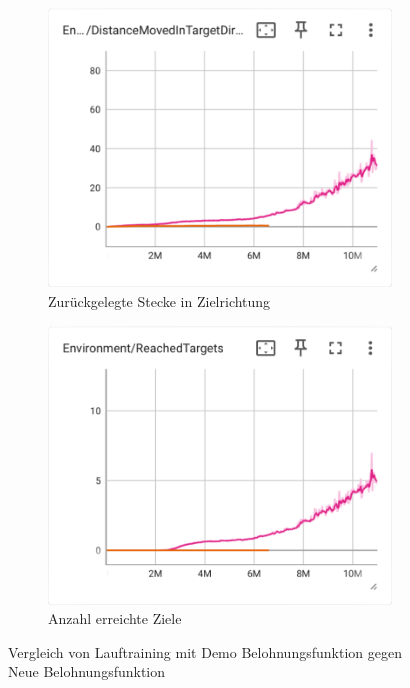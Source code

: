 \begin{figure}[H]
  \centering  
  \begin{subfigure}{.49\textwidth}
      \centering  
      \includegraphics[width=\textwidth]{img/116_127_move_target_dir}
      \caption{Zurückgelegte Stecke in Zielrichtung}
      \label{fig:116_127_move_target_dir}
    \end{subfigure}
    \begin{subfigure}{.49\textwidth}
      \centering  
      \includegraphics[width=\textwidth]{img/116_127_reach_target}
      \caption{Anzahl erreichte Ziele}
      \label{fig:116_127_reach_target}
    \end{subfigure}
  \caption{Vergleich von Lauftraining mit Demo Belohnungsfunktion gegen Neue Belohnungsfunktion}
  \label{fig:training_vergleich_demo_neu}
\end{figure}

